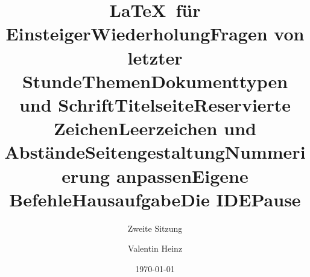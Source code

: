 \documentclass[]{beamer}
\date{}
\author{Valentin Heinz}
\title{\LaTeX \ für Einsteiger}
\subtitle{Zweite Sitzung}
\date{\today}
\begin{document}
\maketitle

\title{Wiederholung}


\title{Fragen von letzter Stunde}


\title{Themen}


\title{Dokumenttypen und Schrift}


\title{Titelseite}


\title{Reservierte Zeichen}


\title{Leerzeichen und Abstände}


\title{Seitengestaltung}


\title{Nummerierung anpassen}


\title{Eigene Befehle}


\title{Hausaufgabe}


\title{Die IDE}


\title{Pause}

\end{document}
